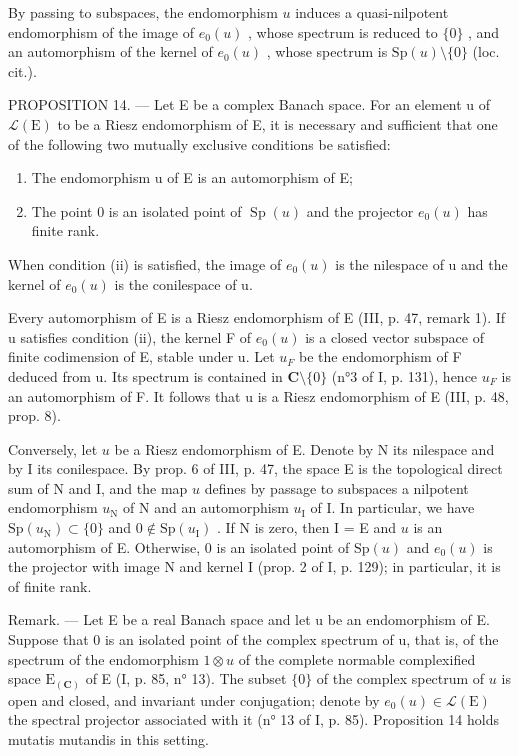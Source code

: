 By passing to subspaces, the endomorphism \(u\) induces a quasi-nilpotent endomorphism of the image of \(e_0(u)\) , whose spectrum is reduced to \(\{0\}\) , and an automorphism of the kernel of \(e_0(u)\) , whose spectrum is \(\mathrm{Sp}(u) \setminus \{0\}\) (loc. cit.).

PROPOSITION 14. --- Let E be a complex Banach space. For an element u of \(\mathcal{L}(\mathrm{E})\) to be a Riesz endomorphism of E, it is necessary and sufficient that one of the following two mutually exclusive conditions be satisfied:

\begin{enumerate}
\def\labelenumi{(\roman{enumi})}
\item
  The endomorphism u of E is an automorphism of E;
\item
  The point 0 is an isolated point of \(\operatorname{Sp}(u)\) and the projector \(e_0(u)\) has finite rank.
\end{enumerate}

When condition (ii) is satisfied, the image of \(e_{0}(u)\) is the nilespace of u and the kernel of \(e_{0}(u)\) is the conilespace of u.

Every automorphism of E is a Riesz endomorphism of E (III, p. 47, remark 1). If u satisfies condition (ii), the kernel F of \(e_{0}(u)\) is a closed vector subspace of finite codimension of E, stable under u. Let \(u_{F}\) be the endomorphism of F deduced from u. Its spectrum is contained in \(\mathbf{C}\setminus\{0\}\) (n°3 of I, p. 131), hence \(u_{F}\) is an automorphism of F. It follows that u is a Riesz endomorphism of E (III, p. 48, prop. 8).

Conversely, let \(u\) be a Riesz endomorphism of E. Denote by N its nilespace and by I its conilespace. By prop. 6 of III, p. 47, the space E is the topological direct sum of N and I, and the map \(u\) defines by passage to subspaces a nilpotent endomorphism \(u_{\mathrm{N}}\) of N and an automorphism \(u_{\mathrm{I}}\) of I. In particular, we have \(\mathrm{Sp}(u_{\mathrm{N}}) \subset \{0\}\) and \(0 \not\in \mathrm{Sp}(u_{\mathrm{I}})\) . If N is zero, then I = E and \(u\) is an automorphism of E. Otherwise, 0 is an isolated point of \(\mathrm{Sp}(u)\) and \(e_0(u)\) is the projector with image N and kernel I (prop. 2 of I, p. 129); in particular, it is of finite rank.

Remark. --- Let E be a real Banach space and let u be an endomorphism of E. Suppose that 0 is an isolated point of the complex spectrum of u, that is, of the spectrum of the endomorphism \(1 \otimes u\) of the complete normable complexified space \(\mathrm{E}_{(\mathbf{C})}\) of E (I, p. 85, n° 13). The subset \(\{0\}\) of the complex spectrum of \(u\) is open and closed, and invariant under conjugation; denote by \(e_0(u) \in \mathcal{L}(\mathrm{E})\) the spectral projector associated with it (n° 13 of I, p. 85). Proposition 14 holds mutatis mutandis in this setting.

